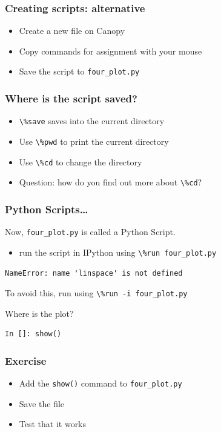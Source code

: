 \documentclass[14pt,compress]{beamer}
\newcounter{time}
\newcommand{\inctime}[1]{\addtocounter{time}{#1}{\tiny \thetime\ m}}
\newcommand{\typ}[1]{\lstinline{#1}}
\begin{document}
\begin{frame}[fragile]
  \frametitle{Creating scripts: alternative}
  \begin{itemize}
  \item Create a new file on Canopy
  \item Copy commands for assignment with your mouse
  \item Save the script to \typ{four_plot.py}
  \end{itemize}
\end{frame}

\begin{frame}[fragile]
  \frametitle{Where is the script saved?}
  \begin{itemize}
  \item \typ{\%save} saves into the current directory
    \vspace*{0.5in}
  \item Use \typ{\%pwd} to print the current directory
  \item Use \typ{\%cd} to change the directory

    \vspace*{0.5in}
  \item Question: how do you find out more about \typ{\%cd}?
  \end{itemize}
\end{frame}


\begin{frame}[fragile]
\frametitle{Python Scripts\ldots}
Now, \typ{four_plot.py} is called a Python Script.
 \begin{itemize}
 \item run the script in IPython using \typ{\%run four_plot.py}\\
 \end{itemize}
\pause
\alert{\typ{NameError: name 'linspace' is not defined}}
\begin{block}{}
To avoid this, run using \alert{\typ{\%run -i four_plot.py}}\\
\end{block}
\pause
Where is the plot?
\begin{lstlisting}
In []: show()
\end{lstlisting}
\end{frame}

\begin{frame}[fragile]
  \frametitle{Exercise}
  \begin{itemize}
  \item Add the \typ{show()} command to \typ{four_plot.py}
  \item Save the file
  \item Test that it works
  \end{itemize}
  \inctime{5}
\end{frame}
\end{document}

